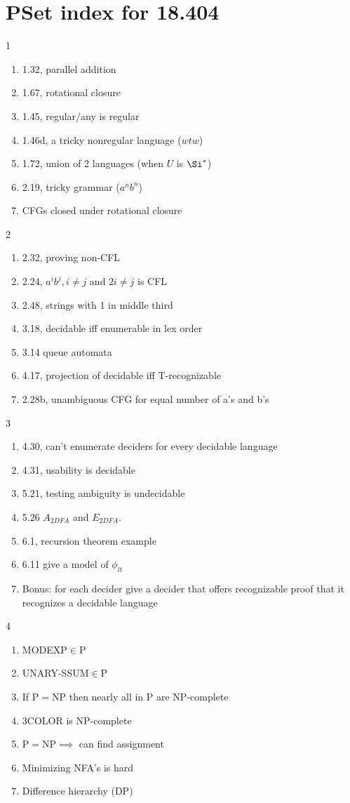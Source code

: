 \section*{PSet index for 18.404}
1
\begin{enumerate}
\item 1.32, parallel addition
\item 1.67, rotational closure
\item 1.45, regular/any is regular
\item 1.46d, a tricky nonregular language ($wtw$)
\item 1.72, union of 2 languages (when $U$ is $\Si^*$)
\item 2.19, tricky grammar ($a^nb^n$)
\item CFGs closed under rotational closure
\end{enumerate}
2
\begin{enumerate}
\item 2.32, proving non-CFL
\item 2.24, $a^ib^j,i\ne j$ and $2i\ne j$ is CFL
\item 2.48, strings with 1 in middle third
\item 3.18, decidable iff enumerable in lex order
\item 3.14 queue automata
\item 4.17, projection of decidable iff T-recognizable
\item 2.28b, unambiguous CFG for equal number of a's and b's
\end{enumerate}
3
\begin{enumerate}
\item
4.30, can't enumerate deciders for every decidable language
\item
4.31, usability is decidable
\item 5.21, testing ambiguity is undecidable
\item 5.26 $A_{2DFA}$ and $E_{2DFA}$.
\item 6.1, recursion theorem example
\item 6.11 give a model of $\phi_{lt}$ 
\item Bonus: for each decider give a decider that offers recognizable proof that it recognizes a decidable language
\end{enumerate}
4
\begin{enumerate}
\item
MODEXP$\in$P
\item
UNARY-SSUM$\in$P
\item If P$=$NP then nearly all in P are NP-complete
\item 3COLOR is NP-complete
\item P$=$NP$\implies$ can find assignment
\item Minimizing NFA's is hard
\item Difference hierarchy (DP)
\end{enumerate}
